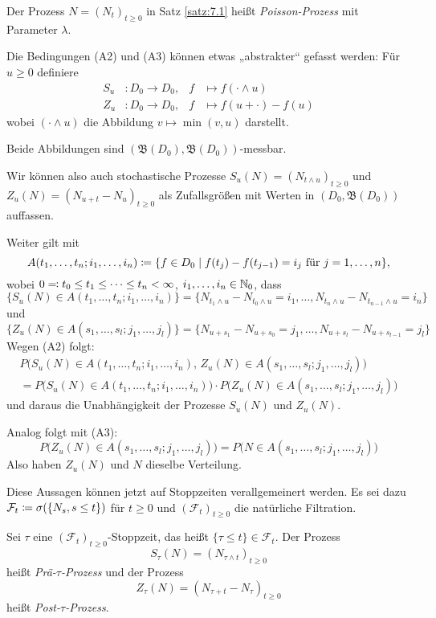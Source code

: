 \documentclass[a4paper,twoside,DIV15,BCOR12mm]{scrbook}
\newcommand{\cF}{\mathcal F}
\newcommand{\borel}{{\mathfrak B}}
\begin{document}
\begin{bemerkung}
Der Prozess $N=(N_t)_{t\ge 0}$ in Satz \ref{satz:7.1} heißt \emph{Poisson-Prozess} mit Parameter $\lambda$.
\end{bemerkung}

Die Bedingungen (A2) und (A3) können etwas „abstrakter“ gefasst werden: Für $u\ge 0$ definiere
\begin{align*}
S_u &: D_0 \to D_0,  & f &\mapsto f(\cdot\wedge u)\\
Z_u &: D_0 \to D_0,  & f &\mapsto f(u+\cdot)-f(u)
\end{align*}
wobei $(\cdot \wedge u)$ die Abbildung $v\mapsto \min (v,u)$ darstellt.

Beide Abbildungen sind $(\borel(D_0), \borel(D_0))$-messbar.

Wir können also auch stochastische Prozesse $S_u(N) = (N_{t\wedge u})_{t\ge 0}$ und $Z_u(N) = (N_{u+t} - N_u)_{t\ge 0}$ als Zufallsgrößen mit Werten in $(D_0,\borel(D_0))$ auffassen.

Weiter gilt mit 
\[
A(t_1,\ldots,t_n;i_1,\ldots,i_n) \da \{f\in D_0\mid f(t_j) - f(t_{j-1}) = i_j\text{ für }j=1,\ldots,n\},
\]
wobei $0 \ad t_0\le t_1\le \cdots\le t_n < \infty$, $i_1,\ldots,i_n\in\mathbb{N}_0$, dass
\[
\{S_u(N) \in A(t_1,\ldots,t_n;i_1,\ldots,i_n)\} 
= \{ N_{t_1\wedge u}- N_{t_0\wedge u} = i_1,\ldots,N_{t_n\wedge u}- N_{t_{n-1}\wedge u} = i_n\}
\]
und
\[
\{Z_u(N) \in A(s_1,\ldots,s_l;j_1,\ldots,j_l)\} 
= \{ N_{u+s_1}- N_{u+s_0} = j_1,\ldots,N_{u+s_l}- N_{u+s_{l-1}} = j_l\} 
\]
Wegen (A2) folgt:
\begin{multline*}
P\big(S_u(N) \in A(t_1,\ldots,t_n;i_1,\ldots,i_n),\,
 Z_u(N) \in A(s_1,\ldots,s_l;j_1,\ldots,j_l)\big) \\
= P\big(S_u(N) \in A(t_1,\ldots,t_n;i_1,\ldots,i_n)\big) 
\cdot P\big(Z_u(N) \in A(s_1,\ldots,s_l;j_1,\ldots,j_l)\big) 
\end{multline*}
und daraus die Unabhängigkeit der Prozesse $S_u(N)$ und $Z_u(N)$.

Analog folgt mit (A3):
\[
P\big(Z_u(N) \in A(s_1,\ldots,s_l;j_1,\ldots,j_l)\big) 
= P\big( N \in A(s_1,\ldots,s_l;j_1,\ldots,j_l)\big)
\]
Also haben $Z_u(N)$ und $N$ dieselbe Verteilung.

Diese Aussagen können jetzt auf Stoppzeiten verallgemeinert werden. Es sei dazu $\cF_t \da \sigma(\{N_s, s\le t\})$ für $t\ge 0$ und $(\cF_t)_{t\ge 0}$ die natürliche Filtration.

\begin{definition}
Sei $\tau$ eine $(\cF_t)_{t\ge 0}$-Stoppzeit, das heißt $\{\tau \le t \} \in \cF_t$. Der Prozess 
\[
S_\tau(N) = (N_{\tau \wedge t})_{t\ge 0}
\]
heißt \emph{Prä-$\tau$-Prozess} und der Prozess 
\[
Z_\tau(N) = (N_{\tau + t} - N_\tau)_{t \ge 0}
\]
heißt \emph{Post-$\tau$-Prozess}.
\end{definition}
\end{document}
